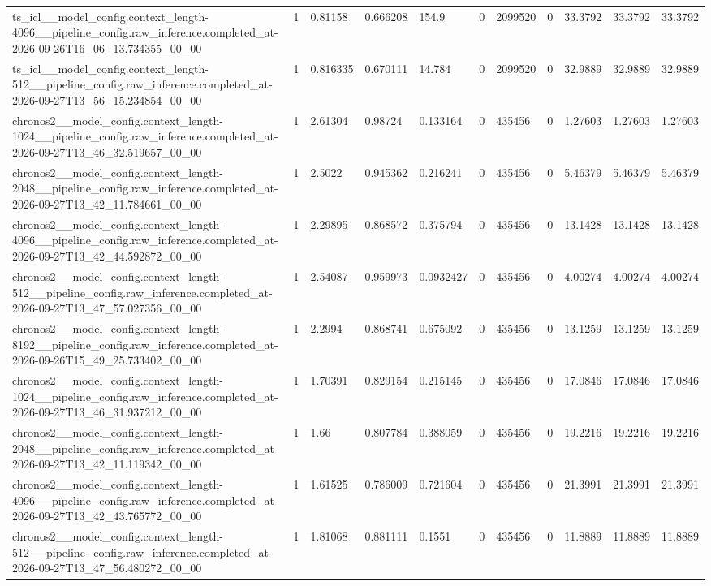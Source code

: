\begin{tabular}{lllllllllll}
ts\_icl\_\_model\_config.context\_length-4096\_\_pipeline\_config.raw\_inference.completed\_at-2026-09-26T16\_06\_13.734355\_00\_00 & 1 & 0.81158 & 0.666208 & 154.9 & 0 & 2099520 & 0 & 33.3792 & 33.3792 & 33.3792 \\
ts\_icl\_\_model\_config.context\_length-512\_\_pipeline\_config.raw\_inference.completed\_at-2026-09-27T13\_56\_15.234854\_00\_00 & 1 & 0.816335 & 0.670111 & 14.784 & 0 & 2099520 & 0 & 32.9889 & 32.9889 & 32.9889 \\
chronos2\_\_model\_config.context\_length-1024\_\_pipeline\_config.raw\_inference.completed\_at-2026-09-27T13\_46\_32.519657\_00\_00 & 1 & 2.61304 & 0.98724 & 0.133164 & 0 & 435456 & 0 & 1.27603 & 1.27603 & 1.27603 \\
chronos2\_\_model\_config.context\_length-2048\_\_pipeline\_config.raw\_inference.completed\_at-2026-09-27T13\_42\_11.784661\_00\_00 & 1 & 2.5022 & 0.945362 & 0.216241 & 0 & 435456 & 0 & 5.46379 & 5.46379 & 5.46379 \\
chronos2\_\_model\_config.context\_length-4096\_\_pipeline\_config.raw\_inference.completed\_at-2026-09-27T13\_42\_44.592872\_00\_00 & 1 & 2.29895 & 0.868572 & 0.375794 & 0 & 435456 & 0 & 13.1428 & 13.1428 & 13.1428 \\
chronos2\_\_model\_config.context\_length-512\_\_pipeline\_config.raw\_inference.completed\_at-2026-09-27T13\_47\_57.027356\_00\_00 & 1 & 2.54087 & 0.959973 & 0.0932427 & 0 & 435456 & 0 & 4.00274 & 4.00274 & 4.00274 \\
chronos2\_\_model\_config.context\_length-8192\_\_pipeline\_config.raw\_inference.completed\_at-2026-09-26T15\_49\_25.733402\_00\_00 & 1 & 2.2994 & 0.868741 & 0.675092 & 0 & 435456 & 0 & 13.1259 & 13.1259 & 13.1259 \\
chronos2\_\_model\_config.context\_length-1024\_\_pipeline\_config.raw\_inference.completed\_at-2026-09-27T13\_46\_31.937212\_00\_00 & 1 & 1.70391 & 0.829154 & 0.215145 & 0 & 435456 & 0 & 17.0846 & 17.0846 & 17.0846 \\
chronos2\_\_model\_config.context\_length-2048\_\_pipeline\_config.raw\_inference.completed\_at-2026-09-27T13\_42\_11.119342\_00\_00 & 1 & 1.66 & 0.807784 & 0.388059 & 0 & 435456 & 0 & 19.2216 & 19.2216 & 19.2216 \\
chronos2\_\_model\_config.context\_length-4096\_\_pipeline\_config.raw\_inference.completed\_at-2026-09-27T13\_42\_43.765772\_00\_00 & 1 & 1.61525 & 0.786009 & 0.721604 & 0 & 435456 & 0 & 21.3991 & 21.3991 & 21.3991 \\
chronos2\_\_model\_config.context\_length-512\_\_pipeline\_config.raw\_inference.completed\_at-2026-09-27T13\_47\_56.480272\_00\_00 & 1 & 1.81068 & 0.881111 & 0.1551 & 0 & 435456 & 0 & 11.8889 & 11.8889 & 11.8889 \\

\end{tabular}
